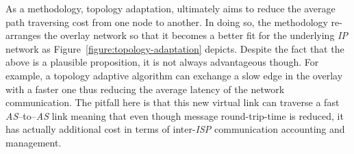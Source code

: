 As a methodology, topology adaptation, ultimately aims to reduce the 
average path traversing cost from one node to another.
In doing so, the methodology re-arranges the
overlay network so that it becomes a better fit 
for the underlying \emph{IP} network
as Figure~\ref{figure:topology-adaptation} depicts.
Despite the fact that the above is a plausible proposition,
it is not always advantageous though. For example, a topology adaptive
algorithm can exchange a slow edge in the overlay with a faster one
thus reducing the average latency of the network communication.
The pitfall here is that this new virtual link
can traverse a fast \emph{AS}--to--\emph{AS} link meaning that even though
message round-trip-time is reduced, it has actually additional cost in terms of
inter-\emph{ISP} communication accounting and management.
\begin{figure}[ht]
\centering
{}\qquad\qquad
{}
\end{figure}
